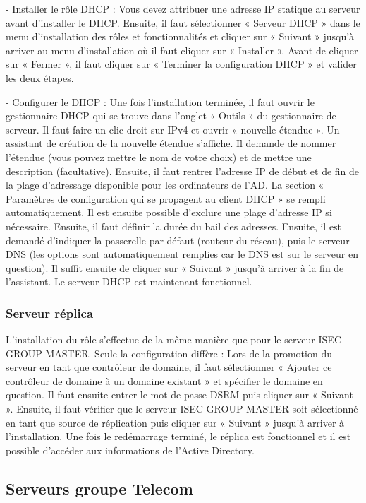-	Installer le rôle DHCP :
Vous devez attribuer une adresse IP statique au serveur avant d’installer le DHCP.
Ensuite, il faut sélectionner « Serveur DHCP » dans le menu d’installation des rôles et fonctionnalités et cliquer sur « Suivant » jusqu’à arriver au menu d’installation où il faut cliquer sur « Installer ». Avant de cliquer sur « Fermer », il faut cliquer sur « Terminer la configuration DHCP » et valider les deux étapes.

-	Configurer le DHCP :
Une fois l’installation terminée, il faut ouvrir le gestionnaire DHCP qui se trouve dans l’onglet « Outils » du gestionnaire de serveur. Il faut faire un clic droit sur IPv4 et ouvrir « nouvelle étendue ». Un assistant de création de la nouvelle étendue s’affiche. Il demande de nommer l’étendue (vous pouvez mettre le nom de votre choix) et de mettre une description (facultative). 
Ensuite, il faut rentrer l’adresse IP de début et de fin de la plage d’adressage disponible pour les ordinateurs de l’AD. La section « Paramètres de configuration qui se propagent au client DHCP » se rempli automatiquement. Il est ensuite possible d’exclure une plage d’adresse IP si nécessaire. Ensuite, il faut définir la durée du bail des adresses. Ensuite, il est demandé d’indiquer la passerelle par défaut (routeur du réseau), puis le serveur DNS (les options sont automatiquement remplies car le DNS est sur le serveur en question). Il suffit ensuite de cliquer sur « Suivant » jusqu’à arriver à la fin de l’assistant. 
Le serveur DHCP est maintenant fonctionnel.

		\subsubsection{Serveur réplica}
L’installation du rôle s’effectue de la même manière que pour le serveur ISEC-GROUP-MASTER. Seule la configuration diffère : Lors de la promotion du serveur en tant que contrôleur de domaine, il faut sélectionner « Ajouter ce contrôleur de domaine à un domaine existant » et spécifier le domaine en question. Il faut ensuite entrer le mot de passe DSRM puis cliquer sur « Suivant ». Ensuite, il faut vérifier que le serveur ISEC-GROUP-MASTER soit sélectionné en tant que source de réplication puis cliquer sur « Suivant » jusqu’à arriver à l’installation. Une fois le redémarrage terminé, le réplica est fonctionnel et il est possible d’accéder aux informations de l’Active Directory.
	\subsection{Serveurs groupe Telecom}
